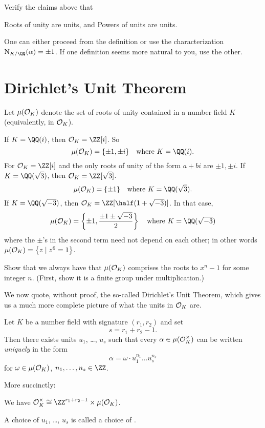\documentclass[11pt]{scrreprt}
\begin{document}
\begin{ques}
	Verify the claims above that
	\begin{enumerate}[(a)]
		\ii Roots of unity are units, and
		\ii Powers of units are units.
	\end{enumerate}
	One can either proceed from the definition
	or use the characterization $\NK(\alpha) = \pm 1$.
	If one definition seems more natural to you, use the other.
\end{ques}

\section{Dirichlet's Unit Theorem}

\begin{definition}
	Let $\mu(\OO_K)$ denote the set of roots of unity
	contained in a number field $K$ (equivalently, in $\mathcal O_K$).
\end{definition}
\begin{example}[Examples of $\mu(\OO_K)$]
	\listhack
	\begin{enumerate}[(a)]
		\ii If $K = \QQ(i)$, then $\OO_K = \ZZ[i]$. So
		\[ \mu(\OO_K) = \{\pm1, \pm i\} \quad\text{where } K = \QQ(i). \]
		For $\OO_K = \ZZ[i]$ and the only roots of unity of the form $a+bi$ are $\pm 1, \pm i$.
		\ii If $K = \QQ(\sqrt3)$, then $\OO_K = \ZZ[\sqrt 3]$.
		\[ \mu(\OO_K) = \{\pm 1\} \quad\text{where } K = \QQ(\sqrt 3). \]
		\ii If $K = \QQ(\sqrt{-3})$, then $\OO_K = \ZZ[\half(1+\sqrt{-3})]$.
		In that case,
		\[ \mu(\OO_K)
			= \left\{ \pm 1, \frac{\pm 1 \pm \sqrt{-3}}{2} \right\}
			\quad\text{where } K = \QQ(\sqrt{-3})
		\]
		where the $\pm$'s in the second term need not depend on each other;
		in other words $\mu(\mathcal O_K) = \left\{ z \mid z^6=1 \right\}$.
	\end{enumerate}
\end{example}
\begin{exercise}
	Show that we always have that $\mu(\OO_K)$
	comprises the roots to $x^n-1$ for some integer $n$.
	(First, show it is a finite group under multiplication.)
\end{exercise}

We now quote, without proof, the so-called Dirichlet's Unit Theorem,
which gives us a much more complete picture of what the units in $\mathcal O_K$ are.

\begin{theorem}
	Let $K$ be a number field with signature $(r_1, r_2)$ and set
	\[ s = r_1 + r_2 - 1. \]
	Then there exists units $u_1$, \dots, $u_s$ such that every $\alpha \in \mu(\mathcal O_K^\times)$
	can be written \emph{uniquely} in the form
	\[ \alpha = \omega \cdot u_1^{n_1} \dots u_s^{n_s} \]
	for $\omega \in \mu(\mathcal O_K)$, $n_1, \dots, n_s \in \ZZ$.
\end{theorem}
More succinctly:
\begin{moral}
We have $\OO_K^\times \cong \ZZ^{r_1+r_2-1} \times \mu(\OO_K)$.
\end{moral}
A choice of $u_1$, \dots, $u_s$ is called a choice of .
\end{document}
